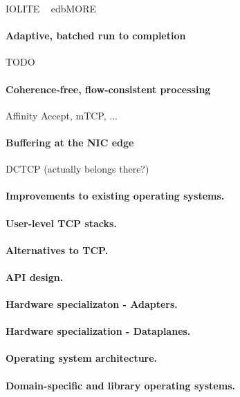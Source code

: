 \todo IOLITE ~\cite{DBLP:journals/tocs/PaiDZ00}
\todo edb{MORE}

\paragraph{Adaptive, batched run to completion}

\todo TODO

\paragraph{Coherence-free, flow-consistent processing}

\todo Affinity Accept, mTCP, ...

\paragraph{Buffering at the NIC edge}

\todo DCTCP (actually belongs there?)


\paragraph{Improvements to existing operating systems.}

\paragraph{User-level TCP stacks.}

\paragraph{Alternatives to TCP.}

\paragraph{API design.}

\paragraph{Hardware specializaton - Adapters.}

\paragraph{Hardware specialization - Dataplanes.}

\paragraph{Operating system architecture.}

\paragraph{Domain-specific and library operating systems.}
